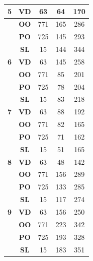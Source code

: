 \documentclass[sigconf,review]{acmart}
\begin{document}
\begin{table}
\begin{tabular}{|c|c|c|c|c|}
\multirow{-4}{*}{\textbf{5}} & \textbf{VD} & 63 & \cellcolor[HTML]{C0C0C0}64 & \cellcolor[HTML]{C0C0C0}170 \\ \hline
 & \textbf{OO} & 771 & 165 & \cellcolor[HTML]{C0C0C0}286 \\ \cline{2-5} 
 & \textbf{PO} & 725 & \cellcolor[HTML]{C0C0C0}145 & \cellcolor[HTML]{C0C0C0}293 \\ \cline{2-5} 
 & \textbf{SL} & 15 & \cellcolor[HTML]{C0C0C0}144 & \cellcolor[HTML]{C0C0C0}344 \\ \cline{2-5} 
\multirow{-4}{*}{\textbf{6}} & \textbf{VD} & 63 & \cellcolor[HTML]{C0C0C0}145 & \cellcolor[HTML]{C0C0C0}258 \\ \hline
 & \textbf{OO} & 771 & \cellcolor[HTML]{C0C0C0}85 & \cellcolor[HTML]{C0C0C0}201 \\ \cline{2-5} 
 & \textbf{PO} & 725 & \cellcolor[HTML]{C0C0C0}78 & \cellcolor[HTML]{C0C0C0}204 \\ \cline{2-5} 
 & \textbf{SL} & 15 & \cellcolor[HTML]{C0C0C0}83 & \cellcolor[HTML]{C0C0C0}218 \\ \cline{2-5} 
\multirow{-4}{*}{\textbf{7}} & \textbf{VD} & 63 & \cellcolor[HTML]{C0C0C0}88 & \cellcolor[HTML]{C0C0C0}192 \\ \hline
 & \textbf{OO} & 771 & 82 & \cellcolor[HTML]{C0C0C0}165 \\ \cline{2-5} 
 & \textbf{PO} & 725 & \cellcolor[HTML]{C0C0C0}71 & \cellcolor[HTML]{C0C0C0}162 \\ \cline{2-5} 
 & \textbf{SL} & 15 & \cellcolor[HTML]{C0C0C0}51 & \cellcolor[HTML]{C0C0C0}165 \\ \cline{2-5} 
\multirow{-4}{*}{\textbf{8}} & \textbf{VD} & 63 & \cellcolor[HTML]{C0C0C0}48 & \cellcolor[HTML]{C0C0C0}142 \\ \hline
 & \textbf{OO} & 771 & 156 & \cellcolor[HTML]{C0C0C0}289 \\ \cline{2-5} 
 & \textbf{PO} & 725 & \cellcolor[HTML]{C0C0C0}133 & \cellcolor[HTML]{C0C0C0}285 \\ \cline{2-5} 
 & \textbf{SL} & 15 & \cellcolor[HTML]{C0C0C0}117 & \cellcolor[HTML]{C0C0C0}274 \\ \cline{2-5} 
\multirow{-4}{*}{\textbf{9}} & \textbf{VD} & 63 & 156 & \cellcolor[HTML]{C0C0C0}250 \\ \hline
 & \textbf{OO} & 771 & 223 & \cellcolor[HTML]{C0C0C0}342 \\ \cline{2-5} 
 & \textbf{PO} & 725 & \cellcolor[HTML]{C0C0C0}193 & \cellcolor[HTML]{C0C0C0}328 \\ \cline{2-5} 
 & \textbf{SL} & 15 & \cellcolor[HTML]{C0C0C0}183 & \cellcolor[HTML]{C0C0C0}351 \\ \cline{2-5} 

\end{tabular}
\end{table}
\end{document}
